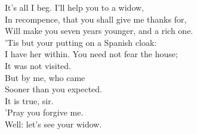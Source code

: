 \documentclass[a4paper,oneside]{memoir}
\begin{document}
\begin{drama*}
It's all I beg. I'll help you to a widow,\\
In recompence, that you shall give me thanks for,\\
Will make you seven years younger, and a rich one.\\
'Tis but your putting on a Spanish cloak:\\
I have her within. You need not fear the house;\\
It was not visited.\\
\lovewitspeaks {} But by me, who came\\
Sooner than you expected.\\
\facespeaks {} It is true, sir.\\
'Pray you forgive me.\\
\lovewitspeaks {} Well: let's see your widow.\\
\scene


\end{drama*}
\end{document}
